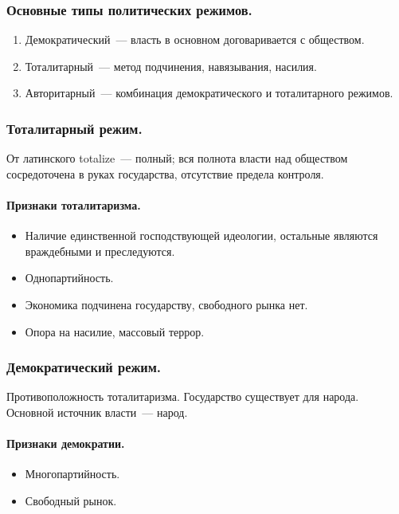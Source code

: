 \documentclass{article}
\begin{document}
	\subsubsection{Основные типы политических режимов.}
	\begin{enumerate}
		\item Демократический~--- власть в основном договаривается с обществом.
		\item Тоталитарный~--- метод подчинения, навязывания, насилия.
		\item Авторитарный~--- комбинация демократического и тоталитарного режимов.
	\end{enumerate}
	\subsubsection{Тоталитарный режим.}
	\begin{definition}
		От латинского totalize~--- полный; вся полнота власти над обществом сосредоточена в руках государства, отсутствие предела контроля.
	\end{definition}
	\paragraph{Признаки тоталитаризма.}
	\begin{itemize}
		\item Наличие единственной господствующей идеологии, остальные являются враждебными и преследуются.
		\item Однопартийность.
		\item Экономика подчинена государству, свободного рынка нет.
		\item Опора на насилие, массовый террор.
	\end{itemize}
	\subsubsection{Демократический режим.}
	\begin{definition}
		Противоположность тоталитаризма. Государство существует для народа. Основной источник власти~--- народ.
	\end{definition}
	\paragraph{Признаки демократии.}
	\begin{itemize}
		\item Многопартийность.
		\item Свободный рынок.
	\end{itemize}
\end{document}
